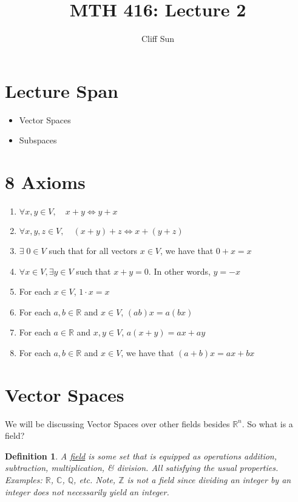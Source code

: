 \documentclass{article}
\title{MTH 416: Lecture 2}
\author{Cliff Sun}
\newtheorem{definition}[theorem]{Definition}
\newtheorem{one minute paper}[theorem]{One Minute Paper}
\begin{document}
\maketitle

\section*{Lecture Span}
\begin{itemize}
    \item Vector Spaces
    \item Subspaces
\end{itemize}

\section*{8 Axioms}
\begin{enumerate}
    \item $\forall x,y \in V, \quad x + y \iff y + x$
    \item $\forall x,y,z \in V, \quad (x+y) + z \iff x + (y+z)$
    \item $\exists \; 0 \in V$ such that for all vectors $x \in V$, we have that $0 + x = x$
    \item $\forall x \in V, \exists y \in V$ such that $x + y = 0$. In other words, $y = -x$
    \item For each $x \in V$, $1\cdot x = x$
    \item For each $a,b \in \mathbb{R}$ and $x \in V$, $(ab)x = a(bx)$
    \item For each $a \in \mathbb{R}$ and $x,y \in V$, $a(x+y) = ax + ay$
    \item For each $a,b \in \mathbb{R}$ and $x \in V$, we have that $(a + b)x = ax + bx$
\end{enumerate}

\section*{Vector Spaces}

We will be discussing Vector Spaces over other fields besides $\mathbb{R}^n$. So what is a field?

\begin{definition}
    A \underline{field} is some set that is equipped as operations addition, subtraction, multiplication, \& division. 
    All satisfying the usual properties. Examples: $\mathbb{R}$, $\mathbb{C}$, $\mathbb{Q}$, etc. Note, $\mathbb{Z}$ is not a field since dividing an integer by an integer
    does not necessarily yield an integer. 
\end{definition}
\end{document}
